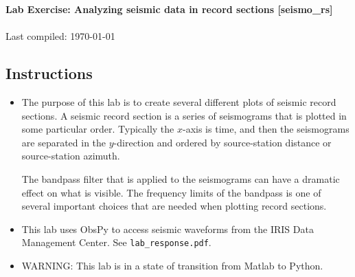 \documentclass[11pt,titlepage,fleqn]{article}
\begin{document}

\begin{spacing}{1.2}
\centering
{\large \bf Lab Exercise: Analyzing seismic data in record sections [seismo\_rs]} \\
\cltag\ \\
Last compiled: \today
\end{spacing}


\subsection*{Instructions}

\begin{itemize}
\item The purpose of this lab is to create several different plots of seismic record sections. A seismic record section is a series of seismograms that is plotted in some particular order. Typically the $x$-axis is time, and then the seismograms are separated in the $y$-direction and ordered by source-station distance or source-station azimuth.

The bandpass filter that is applied to the seismograms can have a dramatic effect on what is visible. The frequency limits of the bandpass is one of several important choices that are needed when plotting record sections.

\item This lab uses ObsPy to access seismic waveforms from the IRIS Data Management Center. See {\tt lab\_response.pdf}.

\item WARNING: This lab is in a state of transition from Matlab to Python.





\end{itemize}
\end{document}
